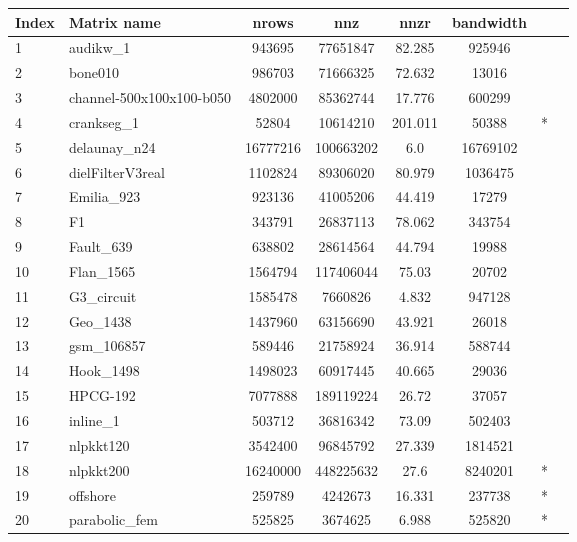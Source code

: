 	\begin{tabular}{|l|l|c|c|c|c|c|c|}
		\toprule
		{Index} & {Matrix name} & {nrows} & {nnz} & {nnzr} & {bandwidth} &  {} &  \\
		\midrule
{1}	& {audikw\_1}	& {943695}	& {77651847}	& {82.285}	& {925946}	& {} &	\multirow{24}{*}{\rotatebox[origin=c]{90}{SuiteSparse Matrix Collection}} \\
{2}	& {bone010}	& {986703}	& {71666325}	& {72.632}	& {13016}	& {} &	\\
{3}	& {channel-500x100x100-b050}	& {4802000}	& {85362744}	& {17.776}	& {600299}	& {} &	\\
{4}	& {crankseg\_1}	& {52804}	& {10614210}	& {201.011}	& {50388}	& {*} &	\\
{5}	& {delaunay\_n24}	& {16777216}	& {100663202}	& {6.0}	& {16769102}	& {} &	\\
{6}	& {dielFilterV3real}	& {1102824}	& {89306020}	& {80.979}	& {1036475}	& {} &	\\
{7}	& {Emilia\_923}	& {923136}	& {41005206}	& {44.419}	& {17279}	& {} &	\\
{8}	& {F1}	& {343791}	& {26837113}	& {78.062}	& {343754}	& {} &	\\
{9}	& {Fault\_639}	& {638802}	& {28614564}	& {44.794}	& {19988}	& {} &	\\
{10}	& {Flan\_1565}	& {1564794}	& {117406044}	& {75.03}	& {20702}	& {} &	\\
{11}	& {G3\_circuit}	& {1585478}	& {7660826}	& {4.832}	& {947128}	& {} &	\\
{12}	& {Geo\_1438}	& {1437960}	& {63156690}	& {43.921}	& {26018}	& {} &	\\
{13}	& {gsm\_106857}	& {589446}	& {21758924}	& {36.914}	& {588744}	& {} &	\\
{14}	& {Hook\_1498}	& {1498023}	& {60917445}	& {40.665}	& {29036}	& {} &	\\
{15}	& {HPCG-192}	& {7077888}	& {189119224}	& {26.72}	& {37057}	& {} &	\\
{16}	& {inline\_1}	& {503712}	& {36816342}	& {73.09}	& {502403}	& {} &	\\
{17}	& {nlpkkt120}	& {3542400}	& {96845792}	& {27.339}	& {1814521}	& {} &	\\
{18}	& {nlpkkt200}	& {16240000}	& {448225632}	& {27.6}	& {8240201}	& {*} &	\\
{19}	& {offshore}	& {259789}	& {4242673}	& {16.331}	& {237738}	& {*} &	\\
{20}	& {parabolic\_fem}	& {525825}	& {3674625}	& {6.988}	& {525820}	& {*} &	\\

\end{tabular}
